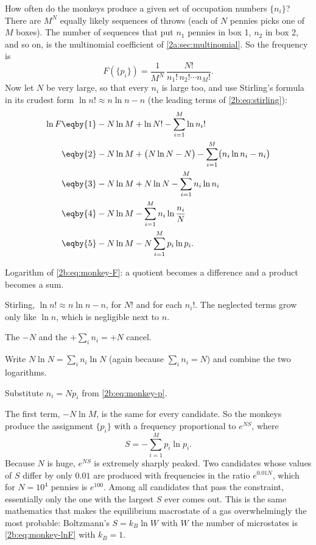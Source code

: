 How often do the monkeys produce a given set of occupation numbers $\{n_i\}$? There are $M^N$ equally likely sequences of throws (each of $N$ pennies picks one of $M$ boxes). The number of sequences that put $n_1$ pennies in box 1, $n_2$ in box 2, and so on, is the multinomial coefficient of \cref{2a:sec:multinomial}. So the frequency is
\begin{equation}
  F(\{p_i\})=\frac{1}{M^N}\,\frac{N!}{n_1!\,n_2!\cdots n_M!} .
  \label{2b:eq:monkey-F}
\end{equation}
Now let $N$ be very large, so that every $n_i$ is large too, and use Stirling's formula in its crudest form $\ln n!\approx n\ln n-n$ (the leading terms of \eqref{2b:eq:stirling}):
\begin{align}
  \ln F
  &\eqby{1} -N\ln M+\ln N!-\sum_{i=1}^M\ln n_i! \nonumber\\
  &\eqby{2} -N\ln M+\bigl(N\ln N-N\bigr)-\sum_{i=1}^M\bigl(n_i\ln n_i-n_i\bigr) \nonumber\\
  &\eqby{3} -N\ln M+N\ln N-\sum_{i=1}^M n_i\ln n_i \nonumber\\
  &\eqby{4} -N\ln M-\sum_{i=1}^M n_i\ln\frac{n_i}{N} \nonumber\\
  &\eqby{5} -N\ln M-N\sum_{i=1}^M p_i\ln p_i .
  \label{2b:eq:monkey-lnF}
\end{align}
\begin{explain}
  \item Logarithm of \eqref{2b:eq:monkey-F}: a quotient becomes a difference and a product becomes a sum.
  \item Stirling, $\ln n!\approx n\ln n-n$, for $N!$ and for each $n_i!$. The neglected terms grow only like $\ln n$, which is negligible next to $n$.
  \item The $-N$ and the $+\sum_i n_i=+N$ cancel.
  \item Write $N\ln N=\sum_i n_i\ln N$ (again because $\sum_in_i=N$) and combine the two logarithms.
  \item Substitute $n_i=Np_i$ from \eqref{2b:eq:monkey-p}.
\end{explain}
The first term, $-N\ln M$, is the same for every candidate. So the monkeys produce the assignment $\{p_i\}$ with a frequency proportional to $e^{NS}$, where
\begin{equation}
  S=-\sum_{i=1}^M p_i\ln p_i .
  \label{2b:eq:entropy-discrete}
\end{equation}
Because $N$ is huge, $e^{NS}$ is extremely sharply peaked. Two candidates whose values of $S$ differ by only $0.01$ are produced with frequencies in the ratio $e^{0.01N}$, which for $N=10^4$ pennies is $e^{100}$. Among all candidates that pass the constraint, essentially only the one with the largest $S$ ever comes out. This is the same mathematics that makes the equilibrium macrostate of a gas overwhelmingly the most probable: Boltzmann's $S=k_B\ln W$ with $W$ the number of microstates is \eqref{2b:eq:monkey-lnF} with $k_B=1$.

